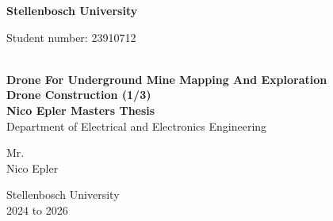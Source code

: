 \thispagestyle{empty}
\begin{center}
{\textbf{Stellenbosch University}}\\
\vskip 20pt

\begin{flushleft}
\hskip 320pt { 
Student number: 23910712
}
\end{flushleft}
\vskip 90pt
{\textbf{\Large }}\\
\vskip 60pt
{\LARGE \textbf{
Drone For Underground Mine Mapping And Exploration}}\\
\vskip 25pt
\textbf{\large Drone Construction (1/3)}\\
\vskip 40pt
\textbf{\Large Nico Epler Masters Thesis} \\
\vskip 40pt
Department of Electrical and Electronics Engineering \\
\vskip 60pt
\begin{flushleft}
\vskip 5pt
\hskip 350pt {\Large Mr.}\\
\vskip 5pt
\hskip 350pt {\Large Nico Epler}
\end{flushleft}
\vskip 100pt

Stellenbosch University\\
\vskip 10pt
2024 to 2026
\end{center}
